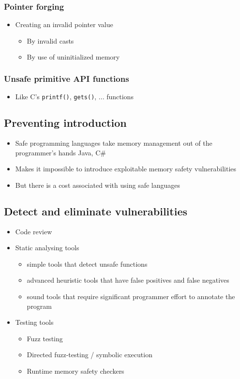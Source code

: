 \documentclass[12pt,titlepage,a4paper]{report}
\begin{document}
	\subsubsection{Pointer forging}
	\begin{itemize}
		\item Creating an invalid pointer value
		\begin{itemize}
			\item By invalid casts
			\item By use of uninitialized memory
		\end{itemize}
	\end{itemize}
	
	\subsubsection{Unsafe primitive API functions}
	\begin{itemize}
		\item Like C's \texttt{printf()}, \texttt{gets()}, ... functions
	\end{itemize}
	
	\subsection{Preventing introduction}
	\begin{itemize}
		\item Safe programming languages take memory management out of the programmer's hands
			\subitem Java, C\#
		\item Makes it impossible to introduce exploitable memory safety vulnerabilities
		\item But there is a cost associated with using safe languages
	\end{itemize}
	
	\subsection{Detect and eliminate vulnerabilities}
	\begin{itemize}
		\item Code review
		\item Static analysing tools
		\begin{itemize}
			\item simple tools that detect unsafe functions
			\item advanced heuristic tools that have false positives and false negatives
			\item sound tools that require significant programmer effort to annotate the program
		\end{itemize}
		\item Testing tools
		\begin{itemize}
			\item Fuzz testing
			\item Directed fuzz-testing / symbolic execution
			\item Runtime memory safety checkers
		\end{itemize}
	\end{itemize}
	
\end{document}
